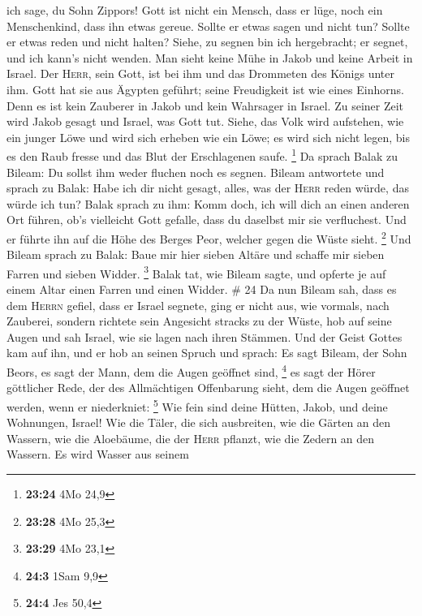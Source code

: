 ich sage, du Sohn Zippors!  Gott ist nicht ein Mensch,
dass er lüge, noch ein Menschenkind, dass ihn etwas gereue. Sollte er
etwas sagen und nicht tun? Sollte er etwas reden und nicht halten?
 Siehe, zu segnen bin ich hergebracht; er segnet, und ich
kann's nicht wenden.  Man sieht keine Mühe in Jakob und
keine Arbeit in Israel. Der \textsc{Herr}, sein Gott, ist bei ihm und
das Drommeten des Königs unter ihm.  Gott hat sie aus
Ägypten geführt; seine Freudigkeit ist wie eines Einhorns.
 Denn es ist kein Zauberer in Jakob und kein Wahrsager in
Israel. Zu seiner Zeit wird Jakob gesagt und Israel, was Gott tut.
 Siehe, das Volk wird aufstehen, wie ein junger Löwe und
wird sich erheben wie ein Löwe; es wird sich nicht legen, bis es den
Raub fresse und das Blut der Erschlagenen saufe. \footnote{\textbf{23:24}
  4Mo 24,9}  Da sprach Balak zu Bileam: Du sollst ihm
weder fluchen noch es segnen.  Bileam antwortete und
sprach zu Balak: Habe ich dir nicht gesagt, alles, was der \textsc{Herr}
reden würde, das würde ich tun?  Balak sprach zu ihm:
Komm doch, ich will dich an einen anderen Ort führen, ob's vielleicht
Gott gefalle, dass du daselbst mir sie verfluchest.  Und
er führte ihn auf die Höhe des Berges Peor, welcher gegen die Wüste
sieht. \footnote{\textbf{23:28} 4Mo 25,3}  Und Bileam
sprach zu Balak: Baue mir hier sieben Altäre und schaffe mir sieben
Farren und sieben Widder. \footnote{\textbf{23:29} 4Mo 23,1}
 Balak tat, wie Bileam sagte, und opferte je auf einem
Altar einen Farren und einen Widder. \# 24  Da nun Bileam
sah, dass es dem \textsc{Herrn} gefiel, dass er Israel segnete, ging er
nicht aus, wie vormals, nach Zauberei, sondern richtete sein Angesicht
stracks zu der Wüste,  hob auf seine Augen und sah Israel,
wie sie lagen nach ihren Stämmen. Und der Geist Gottes kam auf ihn,
 und er hob an seinen Spruch und sprach: Es sagt Bileam,
der Sohn Beors, es sagt der Mann, dem die Augen geöffnet sind,
\footnote{\textbf{24:3} 1Sam 9,9}  es sagt der Hörer
göttlicher Rede, der des Allmächtigen Offenbarung sieht, dem die Augen
geöffnet werden, wenn er niederkniet: \footnote{\textbf{24:4} Jes 50,4}
 Wie fein sind deine Hütten, Jakob, und deine Wohnungen,
Israel!  Wie die Täler, die sich ausbreiten, wie die
Gärten an den Wassern, wie die Aloebäume, die der \textsc{Herr} pflanzt,
wie die Zedern an den Wassern.  Es wird Wasser aus seinem
